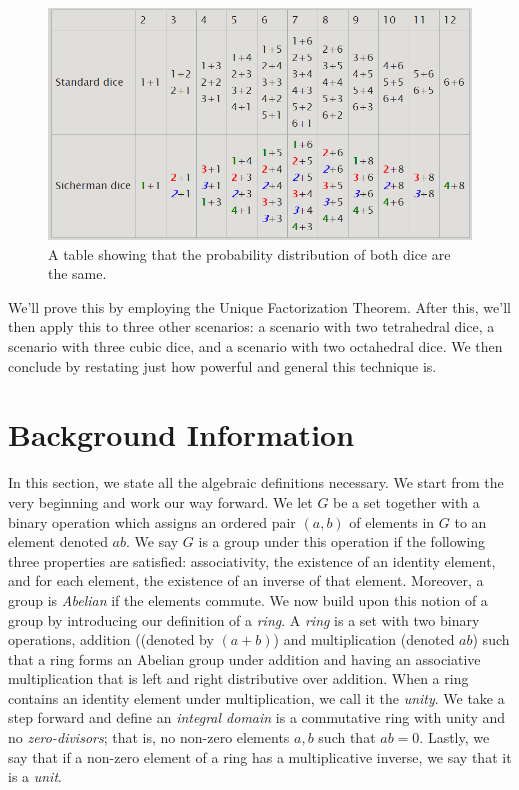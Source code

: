 \documentclass[12pt]{report}
\begin{document}
\begin{figure}[h]
  \includegraphics[width=\linewidth]{images/wikipedia_table.png}
  \caption{A table showing that the probability distribution of both dice are the same.}
  \label{fig:wikipedia_table}
\end{figure}

We'll prove this by employing the Unique Factorization Theorem. After this, we'll then apply this to three other scenarios: a scenario with two tetrahedral dice, a scenario with three cubic dice, and a scenario with two octahedral dice. We then conclude by restating just how powerful and general this technique is. 


\section*{Background Information}
In this section, we state all the algebraic definitions necessary. We start from the very beginning and work our way forward. We let $G$ be a set together with a binary operation which assigns an ordered pair $(a,b)$ of elements in $G$ to an element denoted $ab$. We say $G$ is a group under this operation if the following three properties are satisfied: associativity, the existence of an identity element, and for each element, the existence of an inverse of that element. Moreover, a group is \textit{Abelian} if the elements commute. We now build upon this notion of a group by introducing our definition of a \textit{ring}. A \textit{ring} is a set with two binary operations, addition ((denoted by $(a+b)$) and multiplication (denoted $ab$) such that a ring forms an Abelian group under addition and having an associative multiplication that is left and right distributive over addition. When a ring contains an identity element under multiplication, we call it the \textit{unity}. We take a step forward and define an \textit{integral domain} is a commutative ring with unity and no \textit{zero-divisors}; that is, no non-zero elements $a,b$ such that $ab=0$. Lastly, we say that if a non-zero element of a ring has a multiplicative inverse, we say that it is a \textit{unit}. 
\end{document}
